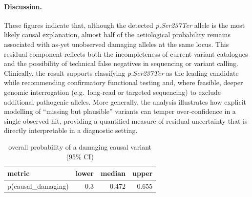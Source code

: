 \paragraph{Discussion.}
These figures indicate that, although the detected \textit{p.Ser237Ter} allele is the most likely causal explanation, almost half of the aetiological probability remains associated with as‑yet unobserved damaging alleles at the same locus.  This residual component reflects both the incompleteness of current variant catalogues and the possibility of technical false negatives in sequencing or variant calling.  Clinically, the result supports classifying \textit{p.Ser237Ter} as the leading candidate while recommending confirmatory functional testing and, where feasible, deeper genomic interrogation (e.g.\ long‑read or targeted sequencing) to exclude additional pathogenic alleles.  More generally, the analysis illustrates how explicit modelling of “missing but plausible” variants can temper over‑confidence in a single observed hit, providing a quantified measure of residual uncertainty that is directly interpretable in a diagnostic setting.


\begin{table}
\caption{overall probability of a damaging causal variant (95\% CI)}
\centering
\begin{tabular}[t]{lrrr}
\toprule
metric & lower & median & upper\\
\midrule
p(causal\_damaging) & 0.3 & 0.472 & 0.655\\
\bottomrule
\end{tabular}
\end{table} 


\begin{table}
\caption{per‑variant probabilities with 95\% credible intervals}
\centering
{}
\end{table} 




